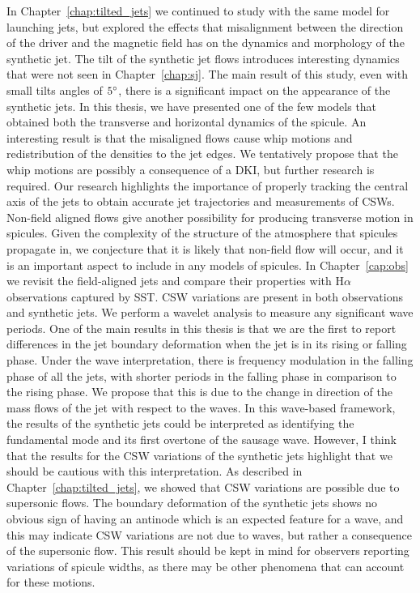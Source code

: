 In Chapter~\ref{chap:tilted_jets} we continued to study with the same model for launching jets, but explored the effects that misalignment between the direction of the driver and the magnetic field has on the dynamics and morphology of the synthetic jet. The tilt of the synthetic jet flows introduces interesting dynamics that were not seen in Chapter~\ref{chap:sj}. The main result of this study, even with small tilts angles of $5^{\circ}$, there is a significant impact on the appearance of the synthetic jets. In this thesis, we have presented one of the few models that obtained both the transverse and horizontal dynamics of the spicule. An interesting result is that the misaligned flows cause whip motions and redistribution of the densities to the jet edges. We tentatively propose that the whip motions are possibly a consequence of a DKI, but further research is required. Our research highlights the importance of properly tracking the central axis of the jets to obtain accurate jet trajectories and measurements of CSWs. Non-field aligned flows give another possibility for producing transverse motion in spicules. Given the complexity of the structure of the atmosphere that spicules propagate in, we conjecture that it is likely that non-field flow will occur, and it is an important aspect to include in any models of spicules. \np
%
In Chapter~\ref{cap:obs} we revisit the field-aligned jets and compare their properties with H$\alpha$ observations captured by SST. CSW variations are present in both observations and synthetic jets. We perform a wavelet analysis to measure any significant wave periods. One of the main results in this thesis is that we are the first to report differences in the jet boundary deformation when the jet is in its rising or falling phase. Under the wave interpretation, there is frequency modulation in the falling phase of all the jets, with shorter periods in the falling phase in comparison to the rising phase. We propose that this is due to the change in direction of the mass flows of the jet with respect to the waves. In this wave-based framework, the results of the synthetic jets could be interpreted as identifying the fundamental mode and its first overtone of the sausage wave. However, I think that the results for the CSW variations of the synthetic jets highlight that we should be cautious with this interpretation. As described in Chapter~\ref{chap:tilted_jets}, we showed that CSW variations are possible due to supersonic flows. The boundary deformation of the synthetic jets shows no obvious sign of having an antinode which is an expected feature for a wave, and this may indicate CSW variations are not due to waves, but rather a consequence of the supersonic flow. This result should be kept in mind for observers reporting variations of spicule widths, as there may be other phenomena that can account for these motions. \np
